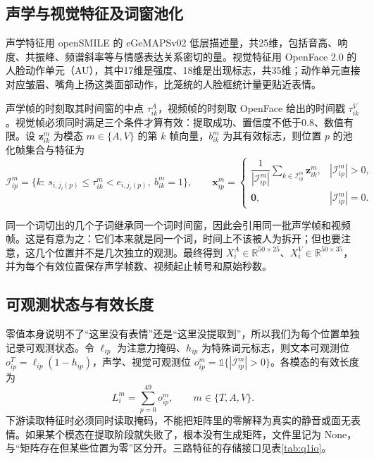 \subsection{声学与视觉特征及词窗池化}\label{sec:q1feat}

声学特征用 openSMILE\cite{eyben2010opensmile} 的 eGeMAPSv02 低层描述量，共25维\cite{eyben2016gemaps}，包括音高、响度、共振峰、频谱斜率等与情感表达关系密切的量。视觉特征用 OpenFace 2.0\cite{baltrusaitis2018openface} 的人脸动作单元（AU），其中17维是强度、18维是出现标志，共35维；动作单元直接对应皱眉、嘴角上扬这类面部动作，比笼统的人脸框统计量更贴近表情。

声学帧的时刻取其时间窗的中点 $\tau_{ik}^A$，视频帧的时刻取 OpenFace 给出的时间戳 $\tau_{ik}^V$。视觉帧必须同时满足三个条件才算有效：提取成功、置信度不低于0.8、数值有限。设 $\boldsymbol z_{ik}^m$ 为模态 $m\in\{A,V\}$ 的第 $k$ 帧向量，$b_{ik}^m$ 为其有效标志，则位置 $p$ 的池化帧集合与特征为
\begin{equation}\label{eq:pool}
\mathcal{I}_{ip}^m=\big\{k:\ s_{i,j_i(p)}\le\tau_{ik}^m<e_{i,j_i(p)},\ b_{ik}^m=1\big\},\qquad
\boldsymbol x_{ip}^m=\begin{cases}\dfrac{1}{|\mathcal{I}_{ip}^m|}\displaystyle\sum_{k\in\mathcal{I}_{ip}^m}\boldsymbol z_{ik}^m, & |\mathcal{I}_{ip}^m|>0,\\[10pt]\mathbf{0}, & |\mathcal{I}_{ip}^m|=0.\end{cases}
\end{equation}

同一个词切出的几个子词继承同一个词时间窗，因此会引用同一批声学帧和视频帧。这是有意为之：它们本来就是同一个词，时间上不该被人为拆开；但也要注意，这几个位置并不是几次独立的观测。最终得到 $X_i^A\in\mathbb{R}^{50\times25}$、$X_i^V\in\mathbb{R}^{50\times35}$，并为每个有效位置保存声学帧数、视频起止帧号和原始秒数。

\subsection{可观测状态与有效长度}\label{sec:q1mask}

零值本身说明不了“这里没有表情”还是“这里没提取到”，所以我们为每个位置单独记录可观测状态。令 $\ell_{ip}$ 为注意力掩码、$h_{ip}$ 为特殊词元标志，则文本可观测位 $o_{ip}^T=\ell_{ip}(1-h_{ip})$，声学、视觉可观测位 $o_{ip}^m=\mathbb{1}\{|\mathcal{I}_{ip}^m|>0\}$。各模态的有效长度为
\begin{equation}\label{eq:len}
L_i^m=\sum_{p=0}^{49}o_{ip}^m,\qquad m\in\{T,A,V\}.
\end{equation}
下游读取特征时必须同时读取掩码，不能把矩阵里的零解释为真实的静音或面无表情。如果某个模态在提取阶段就失败了，根本没有生成矩阵，文件里记为 None，与“矩阵存在但某些位置为零”区分开。三路特征的存储接口见表\ref{tab:q1io}。

